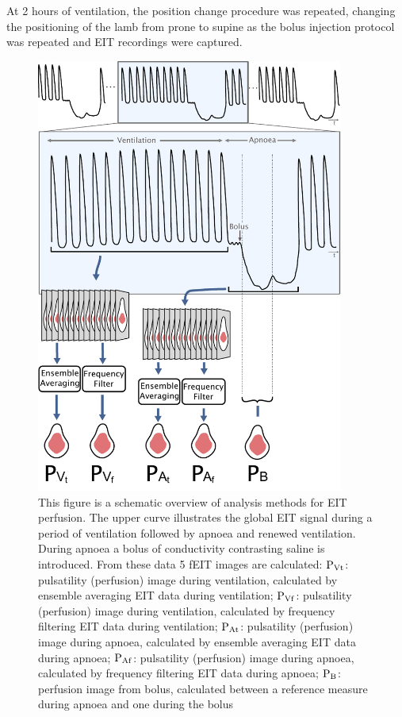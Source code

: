 At 2 hours of ventilation, the position change procedure was repeated,
changing the positioning of the lamb from prone to supine as the bolus 
injection protocol was repeated and EIT recordings were captured.

\begin{figure}[H]
\centering
\includegraphics[width=0.9\textwidth]{chapter3-perfusion_analysis/imgs/fig-methodsOverview.pdf}
\caption[Overview of the EIT analysis methods]{
This figure is a schematic overview of analysis methods for EIT perfusion. 
The upper
curve illustrates the global EIT signal during a period of ventilation
followed by apnoea and renewed ventilation. During apnoea a bolus
of conductivity contrasting saline is introduced. From these data
5 fEIT images are calculated:
${\rm P_{Vt}}$: pulsatility (perfusion) image during ventilation, calculated
by ensemble averaging EIT data during ventilation;
${\rm P_{Vf}}$: pulsatility (perfusion) image during ventilation, calculated
by frequency filtering EIT data during ventilation;
${\rm P_{At}}$: pulsatility (perfusion) image during apnoea, calculated
by ensemble averaging EIT data during apnoea;
${\rm P_{Af}}$: pulsatility (perfusion) image during apnoea, calculated
by frequency filtering EIT data during apnoea;
${\rm P_{B}}$: perfusion image from bolus, calculated between a 
reference measure during apnoea and one during the bolus}
\label{fig:methods}%
\end{figure}

